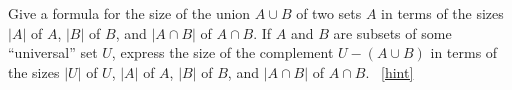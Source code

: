 \documentclass{book}
\begin{document}
\setcounter{project}{217}
\addtocounter{project}{-1}
\begin{activity}[]\label{twosetintersection}
\hypertarget{p-1220}{}%
Give a formula for the size of the union \(A\cup B\) of two sets \(A\) in terms of the sizes \(|A|\) of \(A\), \(|B|\) of \(B\), and \(|A\cap B|\) of \(A\cap B\). If \(A\) and \(B\) are subsets of some ``universal'' set \(U\), express the size of the complement \(U-(A\cup B)\) in terms of the sizes \(|U|\) of \(U\), \(|A|\) of \(A\), \(|B|\) of \(B\), and \(|A\cap B|\) of \(A\cap B\).%
~\hfill{\tiny\hyperlink{a-217}{[hint]}\hypertarget{q-217}{}}\end{activity}
\end{document}
